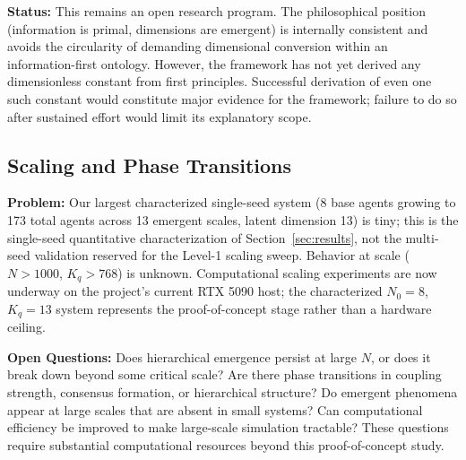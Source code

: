 \documentclass[11pt]{article}
\begin{document}
\textbf{Status:} This remains an open research program. The philosophical position (information is primal, dimensions are emergent) is internally consistent and avoids the circularity of demanding dimensional conversion within an information-first ontology. However, the framework has not yet derived any dimensionless constant from first principles. Successful derivation of even one such constant would constitute major evidence for the framework; failure to do so after sustained effort would limit its explanatory scope.

\subsection{Scaling and Phase Transitions}

\textbf{Problem:} Our largest characterized single-seed system (8 base agents growing to 173 total agents across 13 emergent scales, latent dimension 13) is tiny; this is the single-seed quantitative characterization of Section~\ref{sec:results}, not the multi-seed validation reserved for the Level-1 scaling sweep. Behavior at scale ($N>1000$, $K_q>768$) is unknown. Computational scaling experiments are now underway on the project's current RTX 5090 host; the characterized $N_0{=}8$, $K_q{=}13$ system represents the proof-of-concept stage rather than a hardware ceiling.

\textbf{Open Questions:} Does hierarchical emergence persist at large $N$, or does it break down beyond some critical scale? Are there phase transitions in coupling strength, consensus formation, or hierarchical structure? Do emergent phenomena appear at large scales that are absent in small systems? Can computational efficiency be improved to make large-scale simulation tractable? These questions require substantial computational resources beyond this proof-of-concept study.
\end{document}

